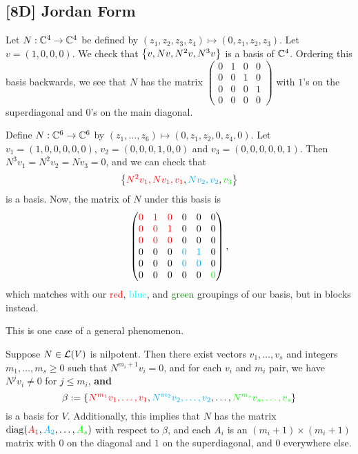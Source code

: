 \documentclass{article}
\newcommand{\red}{\textcolor{red}}
\newcommand{\bl}{\textcolor{cyan}}
\begin{document}
\subsection*{[8D] Jordan Form}
\begin{example}
Let $N: \mathbb C^4\to \mathbb C^4$ be defined by $(z_1, z_2, z_3, z_4)\mapsto (0, z_1, z_2, z_3)$. Let $v = (1, 0, 0, 0)$. We check that $\left\{v, Nv, N^2v, N^3v\right\}$ is a basis of $\mathbb C^4$. Ordering this basis backwards, we see that $N$ has the matrix $\begin{pmatrix} 0& 1 & 0 & 0 \\ 0 & 0 & 1 & 0 \\ 0 & 0 & 0 & 1 \\ 0 & 0 & 0 & 0 \end{pmatrix}$ with $1$'s on the superdiagonal and $0$'s on the main diagonal.
\end{example}
\newpage
{}
\newcommand{\aq}{\textcolor{green}}
\begin{example}
Define $N: \mathbb C^6\to \mathbb C^6$ by $(z_1, \ldots, z_6) \mapsto (0, z_1, z_2, 0, z_4, 0)$. Let $v_1 = (1, 0,0,0,0,0)$, $v_2 = (0,0,0,1,0,0)$ and $v_3 = (0,0, 0, 0, 0, 1)$. Then $N^3v_1 = N^2v_2 = Nv_3 = 0$, and we can check that
$$\set{\textcolor{red}{N^2v_1, Nv_1, v_1}, \textcolor{cyan}{Nv_2, v_2}, \aq{v_3}}$$
is a basis. Now, the matrix of $N$ under this basis is
$$\begin{pmatrix}
\red 0 & \red 1 & \red 0 & 0 & 0 & 0 \\
\red 0 & \red 0 & \red 1 & 0 & 0 & 0 \\
\red 0 & \red 0 & \red 0 & 0 & 0 & 0 \\
0 & 0 & 0 & \bl 0 & \bl 1 & 0 \\
0 & 0 & 0 & \bl 0 & \bl 0 & 0 \\
0 & 0 & 0 & 0 & 0 & \aq 0 \\
\end{pmatrix},$$
which matches with our \red{red}, \bl{blue}, and \aq{green} groupings of our basis, but in blocks instead.
\end{example}
This is one case of a general phenomenon.
\begin{theorem}
Suppose $N\in\mathcal L(V)$ is nilpotent. Then there exist vectors $v_1, \ldots, v_s$ and integers $m_1, \ldots, m_s \geq 0$ such that $N^{m_i+1}v_i = 0$, and for each $v_i$ and $m_i$ pair, we have $N^jv_i \neq 0$ for $j \leq m_i$, \textbf{and}
$$\beta := \set{\red{N^{m_1}v_1, \ldots, v_1}, \bl{N^{m_2}v_2, \ldots, v_2}, \ldots, \aq{N^{m_s}v_s, \ldots, v_s}}$$
is a basis for $V$. Additionally, this implies that $N$ has the matrix $\diag(\red{A_1}, \bl{A_2}, \ldots, \aq{A_s})$ with respect to $\beta$, and each $A_i$ is an $(m_i + 1)\times (m_i+1)$ matrix with $0$ on the diagonal and $1$ on the superdiagonal, and $0$ everywhere else.
\end{theorem}
\end{document}
